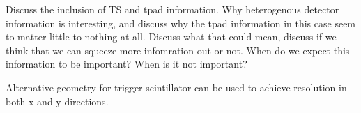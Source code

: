 Discuss the inclusion of TS and tpad information. Why heterogenous detector information is interesting, and discuss why the tpad information in this case seem to matter little to nothing at all. Discuss what that could mean, discuss if we think that we can squeeze more infomration out or not. When do we expect this information to be important? When is it not important? 

Alternative geometry for trigger scintillator can be used to achieve resolution in both x and y directions. 

